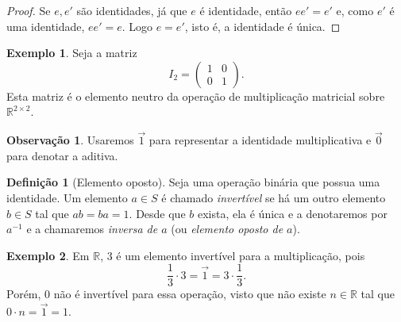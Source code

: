 \documentclass[a4paper,12pt]{article}
\theoremstyle{plain}
\theoremstyle{definition}
\newtheorem{definicao}{Definição}[section]
\newtheorem{observacao}{Observação}[section]
\newtheorem{exemplo}{Exemplo}[section]
\begin{document}
\begin{proof}
	Se \(e,e'\) são identidades, já que \(e\) é identidade, então \(ee' = e'\) e, como $e'$ é uma identidade, \(ee' = e\). Logo \(e = e'\), isto é, a identidade é única.
\end{proof}

\begin{exemplo}
	Seja a matriz 
	$$ I_2 =
	\begin{pmatrix}
		1&0\\
		0&1
	\end{pmatrix}.
	$$ 
	Esta matriz é o elemento neutro da operação de multiplicação matricial sobre $\mathbb{R}^{2\times 2}$.
\end{exemplo}

\begin{observacao}
	Usaremos $\vec{1}$ para representar a identidade multiplicativa e $\vec{0}$ para denotar a aditiva.
\end{observacao}

\begin{definicao}[Elemento oposto]
	Seja uma operação binária que possua uma identidade. Um elemento \(a\in S\) é chamado \emph{invertível} se há um outro elemento \(b\in S\) tal que \(ab = ba = 1\). Desde que \(b\) exista, ela é única e a denotaremos por \(a^{-1}\) e a chamaremos
	\emph{inversa de $a$} (ou \emph{elemento oposto de $a$}).
\end{definicao}

\begin{exemplo}
	Em $\mathbb{R}$, 3 é um elemento invertível para a multiplicação, pois
	$$\frac{1}{3}\cdot3 = \vec{1} =  3\cdot\frac{1}{3}.$$
	Porém, $0$ não é invertível para essa operação, visto que não existe $n\in\mathbb{R}$ tal que $0\cdot n = \vec{1} = 1$.
\end{exemplo}
\end{document}
